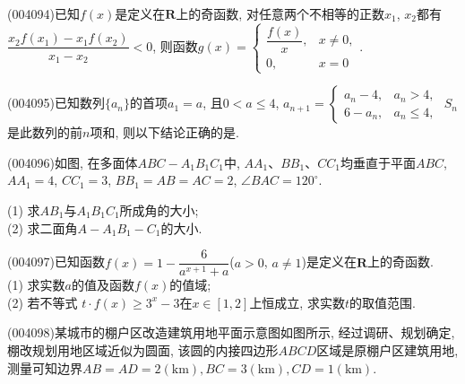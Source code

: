 \item (004094)已知$f(x)$是定义在$\mathbf{R}$上的奇函数, 对任意两个不相等的正数$x_1$, $x_2$都有$\dfrac{x_2f(x_1)-x_1f(x_2)}{x_1-x_2}<0$, 则函数$g(x)=\begin{cases} \dfrac{f(x)}x, &x\ne 0, \\ 0, & x=0 \end{cases}$.
\item (004095)已知数列$\{a_n\}$的首项$a_1=a$, 且$0<a\le 4$, $a_{n+1}=\begin{cases}  a_n-4, & a_n>4,  \\ 6-a_n, & a_n\le 4,  \end{cases}$ $S_n$是此数列的前$n$项和, 则以下结论正确的是.
\item (004096)如图, 在多面体$ABC-A_1B_1C_1$中, $AA_1$、$BB_1$、$CC_1$均垂直于平面$ABC$, $AA_1=4$, $CC_1=3$, $BB_1=AB=AC=2$, $\angle BAC=120^\circ$.
\begin{center}
\end{center}
(1) 求$AB_1$与$A_1B_1C_1$所成角的大小;\\
(2) 求二面角$A-A_1B_1-C_1$的大小.
\item (004097)已知函数$f(x)=1-\dfrac 6{a^{x+1}+a}$($a>0$, $a\ne 1$)是定义在$\mathbf{R}$上的奇函数.\\
(1) 求实数$a$的值及函数$f(x)$的值域;\\
(2) 若不等式 $t\cdot f(x)\ge 3^x-3$在$x\in [1,2]$上恒成立, 求实数$t$的取值范围.
\item (004098)某城市的棚户区改造建筑用地平面示意图如图所示, 经过调研、规划确定, 棚改规划用地区域近似为圆面, 该圆的内接四边形$ABCD$区域是原棚户区建筑用地, 测量可知边界$AB=AD=2(\text{km}), BC=3(\text{km}),CD=1(\text{km})$.\\
